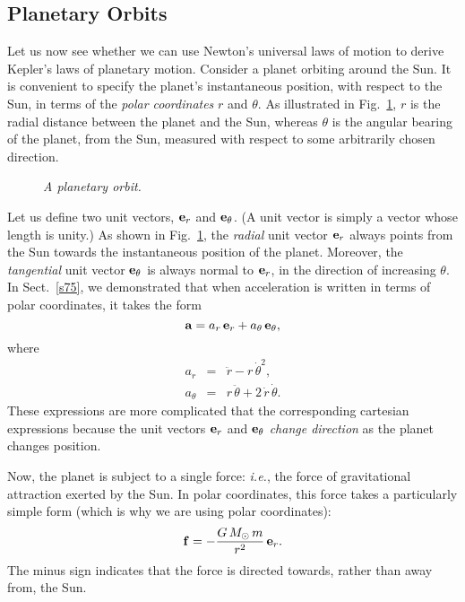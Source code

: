 \subsection{Planetary Orbits}
Let us now see whether we can use Newton's universal laws of motion to derive
Kepler's laws of planetary motion. Consider a planet orbiting around the Sun.
It is convenient to specify the planet's instantaneous position,
with respect to the Sun, in terms of the {\em polar coordinates}\/ $r$ and $\theta$. 
As illustrated in Fig.~\ref{f106}, $r$ is the radial distance between the planet and the
Sun, whereas $\theta$ is the angular bearing of the planet, from the Sun,
measured with respect to some arbitrarily chosen direction.

\begin{figure}
\epsfysize=2.5in
\centerline{}
\caption{\em A planetary orbit.}\label{f106}  
\end{figure}

Let us define two unit vectors, ${\bf e}_r$ and ${\bf e}_\theta$. (A unit vector is
simply a vector whose length is unity.) As shown in Fig.~\ref{f106}, the {\em radial}
unit vector ${\bf e}_r$ always points from the Sun towards the instantaneous position
of the planet. Moreover, the {\em tangential} unit vector ${\bf e}_\theta$ is always
normal to ${\bf e}_r$, in the direction of increasing $\theta$. 
In Sect.~\ref{s75}, we demonstrated that when acceleration is written in terms of polar
coordinates, it takes the form
\begin{equation}
{\bf a} = a_r\,{\bf e}_r + a_\theta\,{\bf e}_\theta,
\end{equation}
where
\begin{eqnarray}
a_r  &=& \ddot{r} - r\,\dot{\theta}^2,\\[0.5ex]
a_\theta &=& r\,\ddot{\theta} + 2\,\dot{r}\,\dot{\theta}.
\end{eqnarray}
These expressions are more complicated that the corresponding cartesian expressions
because the unit vectors  ${\bf e}_r$ and ${\bf e}_\theta$ {\em change direction}
as the planet changes position.

Now, the planet is subject to a single force: {\em i.e.}, the force of gravitational attraction  exerted
by the Sun. In polar coordinates, this force takes a particularly simple
form (which is why we are using polar coordinates):
\begin{equation}
{\bf f} = - \frac{G\,M_\odot\,m}{r^2}\,{\bf e}_r.
\end{equation}
The minus sign indicates that the force is directed towards, rather than away from, the Sun.

